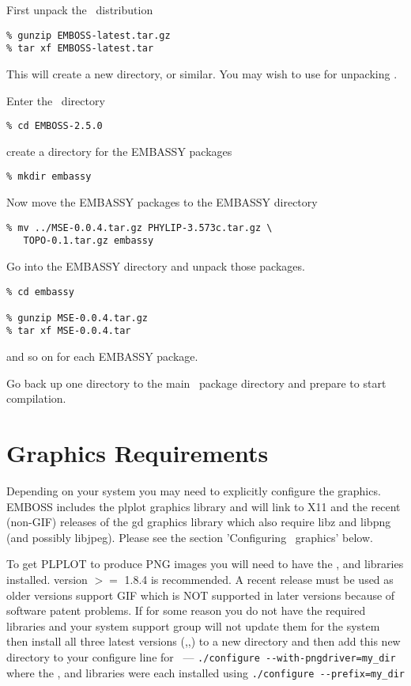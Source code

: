 \documentclass{report}
\begin{document}
First unpack the \EMBOSS\ distribution

\begin{verbatim}
% gunzip EMBOSS-latest.tar.gz
% tar xf EMBOSS-latest.tar
\end{verbatim}

This will create a new directory,  or
similar. You may wish to use  for unpacking \EMBOSS.

Enter the \EMBOSS\ directory

\begin{verbatim}
% cd EMBOSS-2.5.0
\end{verbatim}

create a directory for the EMBASSY packages

\begin{verbatim}
% mkdir embassy
\end{verbatim}

Now move the EMBASSY packages to the EMBASSY directory

\begin{verbatim}
% mv ../MSE-0.0.4.tar.gz PHYLIP-3.573c.tar.gz \
   TOPO-0.1.tar.gz embassy
\end{verbatim}

Go into the EMBASSY directory and unpack those packages.

\begin{verbatim}
% cd embassy

% gunzip MSE-0.0.4.tar.gz
% tar xf MSE-0.0.4.tar
\end{verbatim}

and so on for each EMBASSY package.

Go back up one directory to the main \EMBOSS\ package directory and
prepare to start compilation.

\section{Graphics Requirements}

Depending on your system you may need to explicitly configure the
graphics. EMBOSS includes the plplot graphics library and will link to
X11 and the recent (non-GIF) releases of the gd graphics library which
also require libz and libpng (and possibly libjpeg). Please see the
section 'Configuring \EMBOSS\ graphics' below.

To get PLPLOT to produce PNG images you will need to have the
,
 and
 libraries
installed.  version $>=$ 1.8.4 is recommended. A recent
release must be used as older versions support GIF which is NOT
supported in later versions because of software patent problems.  If
for some reason you do not have the required libraries and your system
support group will not update them for the system then install all
three latest versions (,,) to a
new directory and then add this new directory to your configure line
for \EMBOSS\ --- \verb+./configure --with-pngdriver=my_dir+ where the
,  and  libraries were each
installed using \verb+./configure --prefix=my_dir+
\end{document}
